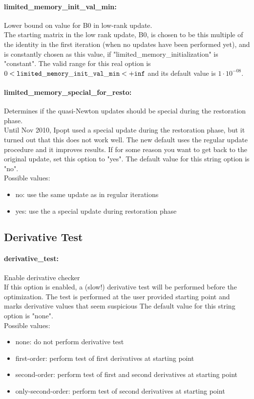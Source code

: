 \paragraph{limited\_memory\_init\_val\_min:}\label{opt:limited_memory_init_val_min} Lower bound on value for B0 in low-rank update. \\
 The starting matrix in the low rank update, B0, is chosen to be this multiple of the identity in the first iteration (when no updates have been performed yet), and is constantly chosen as this value, if "limited\_memory\_initialization" is "constant". The valid range for this real option is 
$0 <  {\tt limited\_memory\_init\_val\_min } <  {\tt +inf}$
and its default value is $1 \cdot 10^{-08}$.


\paragraph{limited\_memory\_special\_for\_resto:}\label{opt:limited_memory_special_for_resto} Determines if the quasi-Newton updates should be special during the restoration phase. \\
 Until Nov 2010, Ipopt used a special update during the restoration phase, but it turned out that this does not work well.  The new default uses the regular update procedure and it improves results.  If for some reason you want to get back to the original update, set this option to "yes". The default value for this string option is "no".
\\ 
Possible values:
\begin{itemize}
   \item no: use the same update as in regular iterations
   \item yes: use the a special update during restoration phase
\end{itemize}

\subsection{Derivative Test}

\paragraph{derivative\_test:}\label{opt:derivative_test} Enable derivative checker \\
 If this option is enabled, a (slow!) derivative test will be performed before the optimization.  The test is performed at the user provided starting point and marks derivative values that seem suspicious The default value for this string option is "none".
\\ 
Possible values:
\begin{itemize}
   \item none: do not perform derivative test
   \item first-order: perform test of first derivatives at starting point
   \item second-order: perform test of first and second derivatives at starting point
   \item only-second-order: perform test of second derivatives at starting point
\end{itemize}

